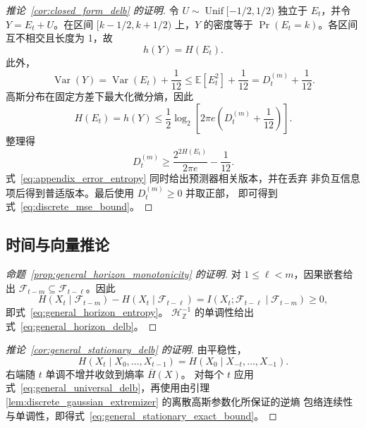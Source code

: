 \begin{proof}[推论~\ref{cor:closed_form_delb} 的证明]
令 \(U\sim\operatorname{Unif}[-1/2,1/2)\) 独立于 \(E_t\)，并令
\(Y=E_t+U\)。在区间 \([k-1/2,k+1/2)\) 上，\(Y\) 的密度等于
\(\Pr(E_t=k)\)。各区间互不相交且长度为 1，故
\begin{equation}
h(Y)=H(E_t).
\label{eq:dither_entropy_identity}
\end{equation}
此外，
\begin{equation}
\operatorname{Var}(Y)
=
\operatorname{Var}(E_t)+\frac{1}{12}
\leq
\mathbb{E}[E_t^2]+\frac{1}{12}
=
D_t^{(m)}+\frac{1}{12}.
\label{eq:dither_variance}
\end{equation}
高斯分布在固定方差下最大化微分熵，因此
\begin{equation}
H(E_t)
=h(Y)
\leq
\frac{1}{2}\log_2\!\left[
2\pi e\left(D_t^{(m)}+\frac{1}{12}\right)
\right].
\label{eq:dither_gaussian_bound}
\end{equation}
整理得
\[
D_t^{(m)}
\geq
\frac{2^{2H(E_t)}}{2\pi e}-\frac{1}{12}.
\]
式~\eqref{eq:appendix_error_entropy} 同时给出预测器相关版本，并在丢弃
非负互信息项后得到普适版本。最后使用 \(D_t^{(m)}\geq0\) 并取正部，
即可得到式~\eqref{eq:discrete_mse_bound}。
\end{proof}

\subsection{时间与向量推论}

\begin{proof}[命题~\ref{prop:general_horizon_monotonicity} 的证明]
对 \(1\leq\ell<m\)，因果嵌套给出
\(\mathcal F_{t-m}\subseteq\mathcal F_{t-\ell}\)。因此
\[
H(X_t\mid\mathcal{F}_{t-m})
-
H(X_t\mid\mathcal{F}_{t-\ell})
=
I(X_t;\mathcal{F}_{t-\ell}\mid\mathcal{F}_{t-m})
\geq0,
\]
即式~\eqref{eq:general_horizon_entropy}。
\(\mathcal H_{\mathbb Z}^{-1}\) 的单调性给出
式~\eqref{eq:general_horizon_delb}。
\end{proof}

\begin{proof}[推论~\ref{cor:general_stationary_delb} 的证明]
由平稳性，
\[
H(X_t\mid X_0,\ldots,X_{t-1})
=
H(X_0\mid X_{-t},\ldots,X_{-1}).
\]
右端随 \(t\) 单调不增并收敛到熵率 \(\overline H(X)\)。
对每个 \(t\) 应用式~\eqref{eq:general_universal_delb}，再使用由引理
\ref{lem:discrete_gaussian_extremizer} 的离散高斯参数化所保证的逆熵
包络连续性与单调性，即得式~\eqref{eq:general_stationary_exact_bound}。
\end{proof}


